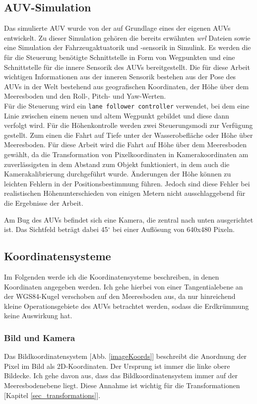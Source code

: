 \subsection{AUV-Simulation}
\label{sec_auvSimGrundlage}
Das simulierte AUV wurde von der \atlas auf Grundlage eines der eigenen AUVs entwickelt. Zu dieser Simulation gehören die bereits erwähnten \textit{wrl} Dateien sowie eine Simulation der Fahrzeugaktuatorik und -sensorik in \matlab Simulink. Es werden die für die Steuerung benötigte Schnittstelle in Form von Wegpunkten und eine Schnittstelle für die innere Sensorik des AUVs bereitgestellt. Die für diese Arbeit wichtigen Informationen aus der inneren Sensorik bestehen aus der Pose des AUVs in der Welt bestehend aus geografischen Koordinaten, der Höhe über dem Meeresboden und den Roll-, Pitch- und Yaw-Werten.\\
Für die Steuerung wird ein \texttt{lane follower controller} verwendet, bei dem eine Linie zwischen einem neuen und altem Wegpunkt gebildet und diese dann verfolgt wird. Für die Höhenkontrolle werden zwei Steuerungsmodi zur Verfügung gestellt. Zum einen die Fahrt auf Tiefe unter der Wasserobefläche oder Höhe über Meeresboden. Für diese Arbeit wird die Fahrt auf Höhe über dem Meeresboden gewählt, da die Transformation von Pixelkoordinaten in Kamerakoordinaten am zuverlässigsten in dem Abstand zum Objekt funktioniert, in dem auch die Kamerakalibrierung durchgeführt wurde. Änderungen der Höhe können zu leichten Fehlern in der Positionsbestimmung führen. Jedoch sind diese Fehler bei realistischen Höhenunterschieden von einigen Metern nicht ausschlaggebend für die Ergebnisse der Arbeit.

Am Bug des AUVs befindet sich eine Kamera, die zentral nach unten ausgerichtet ist. Das Sichtfeld beträgt dabei 45$^\circ$ bei einer Auflösung von 640x480 Pixeln.
\subsection{Koordinatensysteme}
\label{sec_coordsystems}
Im Folgenden werde ich die Koordinatensysteme beschreiben, in denen Koordinaten angegeben werden. Ich gehe hierbei von einer Tangentialebene an der WGS84-Kugel verschoben auf den Meeresboden aus, da nur hinreichend kleine Operationsgebiete des AUVs betrachtet werden, sodass die Erdkrümmung keine Auswirkung hat.
\subsubsection{Bild und Kamera}
\label{sec_img_cam_coords}
Das Bildkoordinatensystem [Abb. \ref{imageKoords}] beschreibt die Anordnung der Pixel im Bild als 2D-Koordinaten. Der Ursprung ist immer die linke obere Bildecke. Ich gehe davon aus, dass das Bildkoordinatensystem immer auf der Meeresbodenebene liegt. Diese Annahme ist wichtig für die Transformationen [Kapitel \ref{sec_transformations}].

